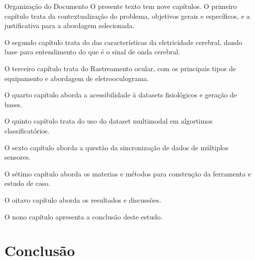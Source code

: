 \documentclass[a4paper, 12pt]{ppgeb}
\makeatletter
\renewcommand{\section}{\@startsection
{section}
{1}
{0mm}
{-\baselineskip}
{0.5\baselineskip}
{\large\bfseries\scshape}}
\makeatother
\begin{document}
\section{Organização do Documento}
O presente texto tem nove capítulos. 
O primeiro capítulo trata da contextualização do problema, 
objetivos gerais e específicos, e a justificativa para a abordagem selecionada. 

O segundo capítulo trata do das características da eletricidade cerebral, dando base para entendimento do que é o sinal de onda
cerebral. 

O terceiro capítulo trata do 
Rastreamento ocular, com os principais tipos de equipamento e abordagem de eletrooculograma.

O quarto capítulo aborda a acessibilidade à datasets fisiológicos e geração de bases. 

O quinto capítulo trata do uso do dataset multimodal em algortimos classificatórios.

O sexto capítulo aborda a questão da sincronização de dados de múltiplos sensores. 

O sétimo capítulo aborda os materias e métodos para construção da ferramenta e estudo de caso.

O oitavo capítulo aborda os resultados e discussões.

O nono capítulo apresenta a conclusão deste estudo. 





%













\chapter{Conclusão}\label{chap:Conclusao}

\renewcommand\bibname{\Large\scshape Lista de Referências}

\end{document}
